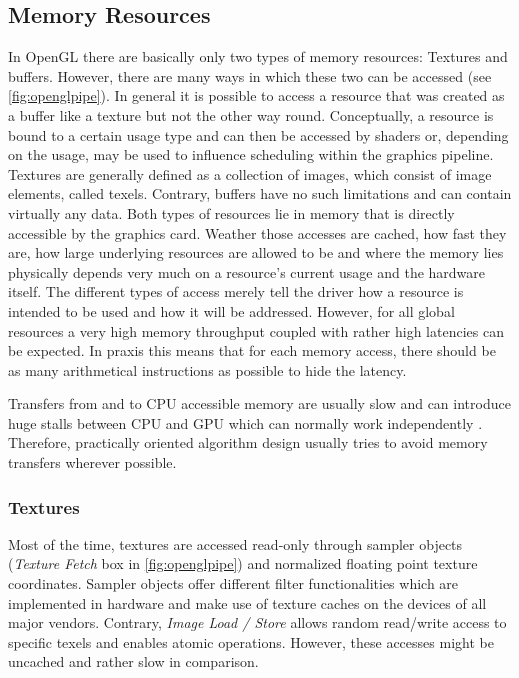 \documentclass[thesis.tex]{subfiles}
\begin{document}
\subsection{Memory Resources} \label{sec:preq:memory}
In OpenGL there are basically only two types of memory resources: Textures and buffers.
However, there are many ways in which these two can be accessed (see \autoref{fig:openglpipe}).
In general it is possible to access a resource that was created as a buffer like a texture but not the other way round.
Conceptually, a resource is bound to a certain usage type and can then be accessed by shaders or, depending on the usage, may be used to influence scheduling within the graphics pipeline.
Textures are generally defined as a collection of images, which consist of image elements, called texels. %
Contrary, buffers have no such limitations and can contain virtually any data.
Both types of resources lie in memory that is directly accessible by the graphics card.
Weather those accesses are cached, how fast they are, how large underlying resources are allowed to be and where the memory lies physically depends very much on a resource's current usage and the hardware itself.
The different types of access merely tell the driver how a resource is intended to be used and how it will be addressed.
However, for all global resources a very high memory throughput coupled with rather high latencies can be expected.
In praxis this means that for each memory access, there should be as many arithmetical instructions as possible to hide the latency.

Transfers from and to CPU accessible memory are usually slow and can introduce huge stalls between CPU and GPU which can normally work independently \cite{bib:openglinsightstransfer}.
Therefore, practically oriented algorithm design usually tries to avoid memory transfers wherever possible.

\subsubsection{Textures}
Most of the time, textures are accessed read-only through sampler objects (\emph{Texture Fetch} box in \autoref{fig:openglpipe}) and normalized floating point texture coordinates.
Sampler objects offer different filter functionalities which are implemented in hardware and make use of texture caches on the devices of all major vendors.
Contrary, \emph{Image Load / Store} allows random read/write access to specific texels and enables atomic operations.
However, these accesses might be uncached and rather slow in comparison.
\end{document}
